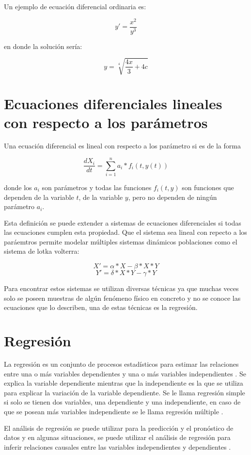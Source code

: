 Un ejemplo de ecuación diferencial ordinaria es:

$$y' = \frac{x^2}{y^3}$$

en donde la solución sería:

$$y = \sqrt[4]{\frac{4x}{3} + 4c}$$


\section{Ecuaciones diferenciales lineales con respecto a los parámetros}

Una ecuación diferencial es lineal con respecto a los parámetro si es de la forma

$$\frac{dX_i}{dt} = \sum_{i=1}^{n} a_i * f_i(t, y(t))$$

donde los $a_i$ son parámetros y todas las funciones $f_i(t,y)$ son funciones que dependen de la variable $t$, de la variable $y$, pero no dependen de ningún parámetro $a_i$.

Esta definición se puede extender a sistemas de ecuaciones diferenciales si todas las ecuaciones cumplen esta propiedad. Que el sistema sea lineal con repecto a los paráemtros permite modelar múltiples sistemas dinámicos poblaciones como el sistema de lotka volterra:

$$X' = \alpha * X - \beta * X * Y$$
$$Y' = \delta * X * Y - \gamma * Y$$

Para encontrar estos sistemas se utilizan diversas técnicas ya que muchas veces solo se poseen muestras de algún fenómeno físico en concreto y no se conoce las ecuaciones que lo describen, una de estas técnicas es la regresión.

\section{Regresión}

La regresión es un conjunto de procesos estadísticos para estimar las relaciones entre una o más variables dependientes y una o más variables independientes \cite{johnson2015applied}. Se explica la variable dependiente mientras que la independiente es la que se utiliza para explicar la variación de la variable dependiente. Se le llama regresión simple si solo se tienen dos variables, una dependiente y una independiente, en caso de que se posean más variables independiente se le llama regresión múltiple \cite{mann2007introductory}.

El análisis de regresión se puede utilizar para la predicción y el pronóstico de datos y en algunas situaciones, se puede utilizar el análisis de regresión para inferir relaciones causales entre las variables independientes y dependientes \cite{mann2007introductory}.


